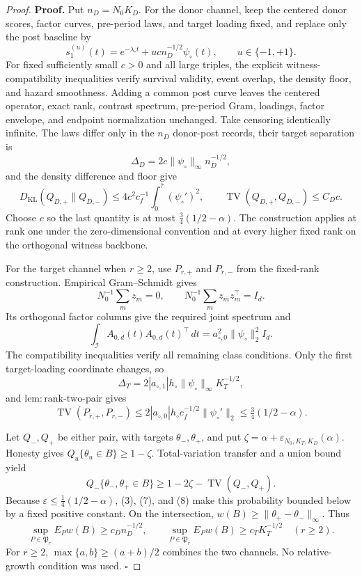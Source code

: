 \documentclass{article}
\begin{document}
\begin{proof}
\textbf{Proof.}
Put \(n_D=N_0K_D\). For the donor channel, keep the centered donor scores, factor curves, pre-period laws, and target loading fixed, and replace only the post baseline by
\[
 s_1^{(u)}(t)=e^{-\lambda_\circ t}+u c n_D^{-1/2}\psi_\circ(t),
 \qquad u\in\{-1,+1\}.                                  \tag{1}
\]
For fixed sufficiently small \(c>0\) and all large triples, the explicit witness-compatibility inequalities verify survival validity, event overlap, the density floor, and hazard smoothness. Adding a common post curve leaves the centered operator, exact rank, contrast spectrum, pre-period Gram, loadings, factor envelope, and endpoint normalization unchanged. Take censoring identically infinite. The laws differ only in the \(n_D\) donor-post records, their target separation is
\[
 \Delta_D=2c\|\psi_\circ\|_\infty n_D^{-1/2},           \tag{2}
\]
and the density difference and floor give
\[
 D_{\mathrm{KL}}(Q_{D,+}\|Q_{D,-})
 \le4c^2c_f^{-1}\int_0^{\bar\tau}(\psi_\circ')^2,
 \qquad \operatorname{TV}(Q_{D,+},Q_{D,-})\le C_Dc.     \tag{3}
\]
Choose \(c\) so the last quantity is at most \(\tfrac34(1/2-\alpha)\). The construction applies at rank one under the zero-dimensional convention and at every higher fixed rank on the orthogonal witness backbone.

For the target channel when \(r\ge2\), use \(P_{r,+}\) and \(P_{r,-}\) from the fixed-rank construction. Empirical Gram--Schmidt gives
\[
 N_0^{-1}\sum_mz_m=0,
 \qquad N_0^{-1}\sum_mz_mz_m^\top=I_d.                  \tag{4}
\]
Its orthogonal factor columns give the required joint spectrum and
\[
 \int_{\mathcal I}A_{0,d}(t)A_{0,d}(t)^\top\,dt
 =a_{\circ,0}^2\|\psi_\circ\|_2^2I_d.                   \tag{5}
\]
The compatibility inequalities verify all remaining class conditions. Only the first target-loading coordinate changes, so
\[
 \Delta_T=2|a_{\circ,1}|h_\circ\|\psi_\circ\|_\infty K_T^{-1/2}, \tag{6}
\]
and \(\mathrm{lem:rank\mbox{-}two\mbox{-}pair}\) gives
\[
 \operatorname{TV}(P_{r,+},P_{r,-})
 \le2|a_{\circ,0}|h_\circ c_f^{-1/2}\|\psi_\circ'\|_2
 \le\tfrac34(1/2-\alpha).                               \tag{7}
\]

Let \(Q_-,Q_+\) be either pair, with targets \(\theta_-,\theta_+\), and put \(\zeta=\alpha+\varepsilon_{N_0,K_T,K_D}(\alpha)\). Honesty gives \(Q_u\{\theta_u\in B\}\ge1-\zeta\). Total-variation transfer and a union bound yield
\[
 Q_-\{\theta_-,\theta_+\in B\}
 \ge1-2\zeta-\operatorname{TV}(Q_-,Q_+).                 \tag{8}
\]
Because \(\varepsilon\le\tfrac14(1/2-\alpha)\), (3), (7), and (8) make this probability bounded below by a fixed positive constant. On the intersection, \(w(B)\ge\|\theta_+-\theta_-\|_\infty\). Thus
\[
 \sup_{P\in\mathfrak P_r}E_Pw(B)\ge c_Dn_D^{-1/2},
 \qquad
 \sup_{P\in\mathfrak P_r}E_Pw(B)\ge c_TK_T^{-1/2}
 \quad(r\ge2).                                           \tag{9}
\]
For \(r\ge2\), \(\max\{a,b\}\ge(a+b)/2\) combines the two channels. No relative-growth condition was used. \(\square\)
\end{proof}
\end{document}
